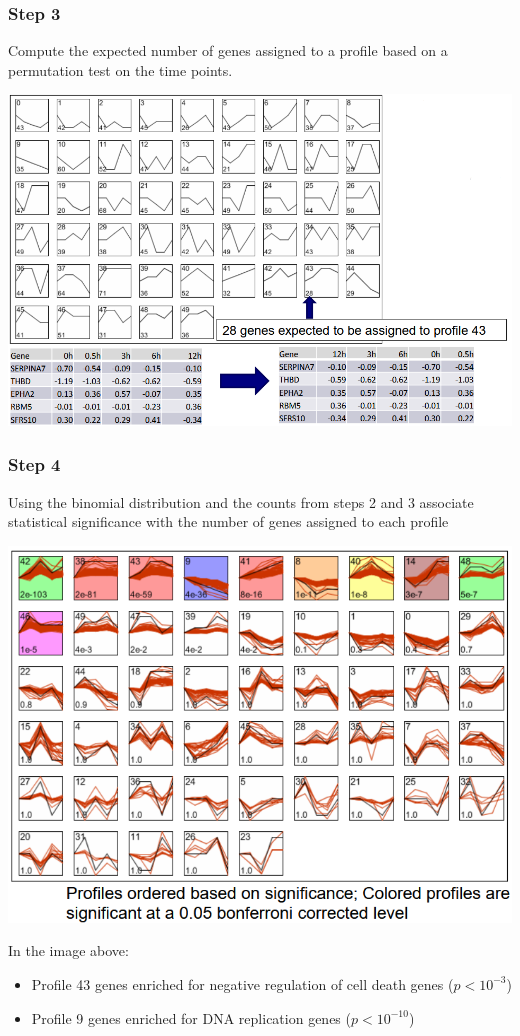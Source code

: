 \documentclass[10pt]{article}
\begin{document}
\subsubsection*{Step 3}
Compute the expected number of genes assigned to a profile based on a permutation test on the time points.
\begin{center}
    \includegraphics*[width=\textwidth]{W6_47.png}
\end{center}
\subsubsection*{Step 4}
Using the binomial distribution and the counts from steps 2 and 3 associate statistical significance with the number of genes assigned to each profile
\begin{center}
    \includegraphics*[width=\textwidth]{W6_48.png}
\end{center}
In the image above:
\begin{itemize}
    \item Profile 43 genes enriched for negative regulation of cell death genes ($p < 10^{-3}$)
    \item Profile 9 genes enriched for DNA replication genes ($p < 10^{-10}$)
\end{itemize}
\end{document}
